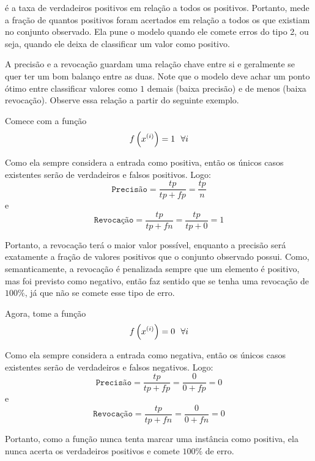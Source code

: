 é a taxa de verdadeiros positivos em relação a todos os positivos. Portanto,
mede a fração de quantos positivos foram acertados em relação a todos os que
existiam no conjunto observado. Ela pune o modelo quando ele comete erros do
tipo 2, ou seja, quando ele deixa de classificar um valor como positivo.

A precisão e a revocação guardam uma relação chave entre si e geralmente se quer
ter um bom balanço entre as duas. Note que o modelo deve achar um ponto ótimo
entre classificar valores como $1$ demais (baixa precisão) e de menos (baixa
revocação). Observe essa relação a partir do seguinte exemplo.

Comece com a função
\begin{equation}
  f\paren{\xii[x]{i}} = 1~~\forall i
\end{equation}

Como ela sempre considera a entrada como positiva, então os únicos casos
existentes serão de verdadeiros e falsos positivos. Logo:
\[
\texttt{Precisão} = \dfrac{tp}{tp+fp} = \dfrac{tp}{n}
\]
e
\[
\texttt{Revocação} = \dfrac{tp}{tp+fn} = \dfrac{tp}{tp+0} = 1
\]

Portanto, a revocação terá o maior valor possível, enquanto a precisão será
exatamente a fração de valores positivos que o conjunto observado possui. Como,
semanticamente, a revocação é penalizada sempre que um elemento é positivo, mas
foi previsto como negativo, então faz sentido que se tenha uma revocação de
$100\%$, já que não se comete esse tipo de erro.

Agora, tome a função
\begin{equation}
  f\paren{\xii[x]{i}} = 0~~\forall i
\end{equation}

Como ela sempre considera a entrada como negativa, então os únicos casos
existentes serão de verdadeiros e falsos negativos. Logo:
\[
\texttt{Precisão} = \dfrac{tp}{tp+fp} = \dfrac{0}{0+fp} = 0
\]
e
\[
\texttt{Revocação} = \dfrac{tp}{tp+fn} = \dfrac{0}{0+fn} = 0
\]

Portanto, como a função nunca tenta marcar uma instância como positiva, ela
nunca acerta os verdadeiros positivos e comete $100\%$ de erro.

